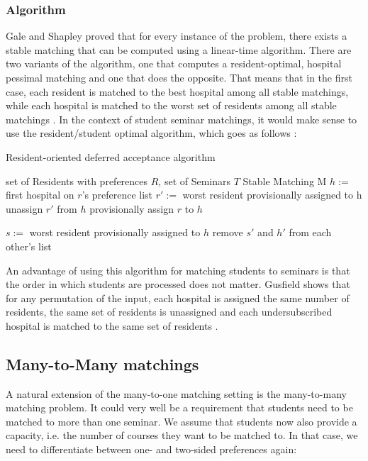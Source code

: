 \subsubsection{Algorithm}
Gale and Shapley \cite{GaleShapleyOrig} proved that for every instance of the problem, there exists a stable matching that can be computed using a linear-time algorithm. There are two variants of the algorithm, one that computes a resident-optimal, hospital pessimal matching and one that does the opposite. That means that in the first case, each resident is matched to the best hospital among all stable matchings, while each hospital is matched to the worst set of residents among all stable matchings \cite{Gusfield}. In the context of student seminar matchings, it would make sense to use the resident/student optimal algorithm, which goes as follows \cite{Gusfield}:
\begin{algorithm} %
    \caption{Resident-oriented deferred acceptance algorithm} 
    \label{alg:resident-oriented-algorithm} 
    \begin{algorithmic} %
        \Require set of Residents with preferences $R$, set of Seminars $T$
        \Ensure Stable Matching M
        \State $h:=$ first hospital on $r$'s preference list
            \State $r':=$ worst resident provisionally assigned to h
            \State unassign $r'$ from $h$
        \EndIf
        \State provisionally assign $r$ to $h$

            $s:=$ worst resident provisionally assigned to $h$
                \State remove $s'$ and $h'$ from each other's list
            \EndFor
        \EndIf

        \EndWhile
    \end{algorithmic}
\end{algorithm}

An advantage of using this algorithm for matching students to seminars is that the order in which students are processed does not matter. Gusfield shows that for any permutation of the input, each hospital is assigned the same number of residents, the same set of residents is unassigned and each undersubscribed hospital is matched to the same set of residents \cite{Gusfield}.

\subsection{Many-to-Many matchings}
A natural extension of the many-to-one matching setting is the many-to-many matching problem. It could very well be a requirement that students need to be matched to more than one seminar. We assume that students now also provide a capacity, i.e. the number of courses they want to be matched to. In that case, we need to differentiate between one- and two-sided preferences again:

